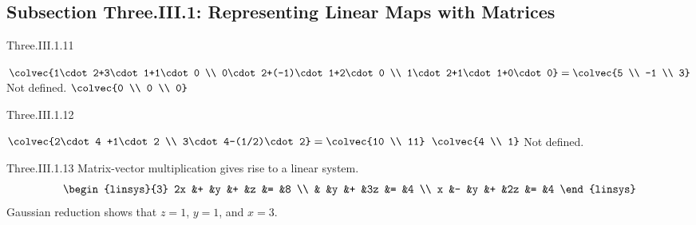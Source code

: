 \subsection{Subsection Three.III.1: Representing Linear Maps with Matrices}
\begin{ans}{Three.III.1.11}
      \begin{exparts*}
        \partsitem \(
           \colvec{1\cdot 2+3\cdot 1+1\cdot 0         \\
                        0\cdot 2+(-1)\cdot 1+2\cdot 0 \\
                        1\cdot 2+1\cdot 1+0\cdot 0}
           =\colvec{5 \\ -1 \\ 3}   \)
        \partsitem Not defined.
        \partsitem \(  \colvec{0 \\ 0 \\ 0}  \)
      \end{exparts*}
    
\end{ans}
\begin{ans}{Three.III.1.12}
      \begin{exparts*}
        \partsitem $\colvec{2\cdot 4 +1\cdot 2 \\
                            3\cdot 4-(1/2)\cdot 2}
                   =\colvec{10 \\ 11}$
        \partsitem $\colvec{4 \\ 1}$
        \partsitem Not defined.
      \end{exparts*}
    
\end{ans}
\begin{ans}{Three.III.1.13}
      Matrix-vector multiplication gives rise to a linear system.
      \begin{equation*}
        \begin{linsys}{3}
          2x  &+  &y  &+  &z  &=  &8  \\
              &   &y  &+  &3z &=  &4  \\
           x  &-  &y  &+  &2z &=  &4
        \end{linsys}
      \end{equation*}
      Gaussian reduction shows that \( z=1 \), \( y=1 \), and \( x=3 \).
    
\end{ans}
